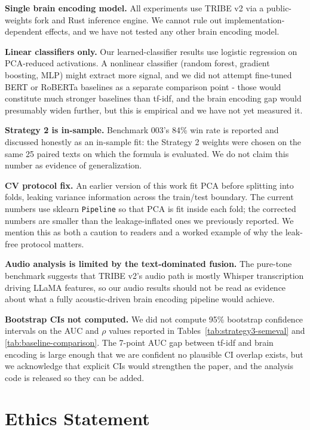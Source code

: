 \documentclass[11pt]{article}
\begin{document}
\textbf{Single brain encoding model.} All experiments use TRIBE v2 via a public-weights fork and Rust inference engine. We cannot rule out implementation-dependent effects, and we have not tested any other brain encoding model.

\textbf{Linear classifiers only.} Our learned-classifier results use logistic regression on PCA-reduced activations. A nonlinear classifier (random forest, gradient boosting, MLP) might extract more signal, and we did not attempt fine-tuned BERT or RoBERTa baselines as a separate comparison point - those would constitute much stronger baselines than tf-idf, and the brain encoding gap would presumably widen further, but this is empirical and we have not yet measured it.

\textbf{Strategy 2 is in-sample.} Benchmark 003's 84\% win rate is reported and discussed honestly as an in-sample fit: the Strategy 2 weights were chosen on the same 25 paired texts on which the formula is evaluated. We do not claim this number as evidence of generalization.

\textbf{CV protocol fix.} An earlier version of this work fit PCA before splitting into folds, leaking variance information across the train/test boundary. The current numbers use sklearn \texttt{Pipeline} so that PCA is fit inside each fold; the corrected numbers are smaller than the leakage-inflated ones we previously reported. We mention this as both a caution to readers and a worked example of why the leak-free protocol matters.

\textbf{Audio analysis is limited by the text-dominated fusion.} The pure-tone benchmark suggests that TRIBE v2's audio path is mostly Whisper transcription driving LLaMA features, so our audio results should not be read as evidence about what a fully acoustic-driven brain encoding pipeline would achieve.

\textbf{Bootstrap CIs not computed.} We did not compute 95\% bootstrap confidence intervals on the AUC and $\rho$ values reported in Tables~\ref{tab:strategy3-semeval} and \ref{tab:baseline-comparison}. The 7-point AUC gap between tf-idf and brain encoding is large enough that we are confident no plausible CI overlap exists, but we acknowledge that explicit CIs would strengthen the paper, and the analysis code is released so they can be added.

\section*{Ethics Statement}
\end{document}
